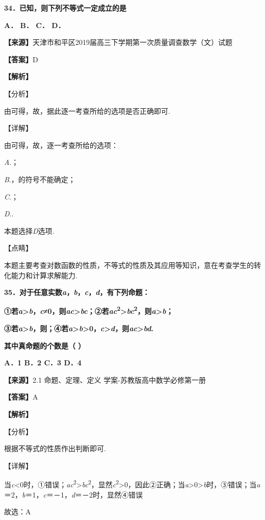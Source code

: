 \textbf{34．已知，则下列不等式一定成立的是}

\textbf{A． B． C． D．}

\textbf{【来源】}天津市和平区2019届高三下学期第一次质量调查数学（文）试题

\textbf{【答案】}D

\textbf{【解析】}

【分析】

由可得，故，据此逐一考查所给的选项是否正确即可.

【详解】

由可得，故，逐一考查所给的选项：

\emph{A}.；

\emph{B}.，的符号不能确定；

\emph{C}.；

\emph{D}..

本题选择\emph{D}选项.

【点睛】

本题主要考查对数函数的性质，不等式的性质及其应用等知识，意在考查学生的转化能力和计算求解能力.

\textbf{35．对于任意实数\emph{a}，\emph{b}，\emph{c}，\emph{d}，有下列命题：}

\textbf{①若\emph{a}\textgreater{}\emph{b}，\emph{c}≠0，则\emph{ac}\textgreater{}\emph{bc}；②若\emph{ac}\textsuperscript{2}\textgreater{}\emph{bc}\textsuperscript{2}，则\emph{a}\textgreater{}\emph{b}；}

\textbf{③若\emph{a}\textgreater{}\emph{b}，则；④若\emph{a}\textgreater{}\emph{b}\textgreater0，\emph{c}\textgreater{}\emph{d}，则\emph{ac}\textgreater{}\emph{bd}.}

\textbf{其中真命题的个数是（ ）}

\textbf{A．1 B．2 C．3 D．4}

\textbf{【来源】}2.1 命题、定理、定义 学案-苏教版高中数学必修第一册

\textbf{【答案】}A

\textbf{【解析】}

【分析】

根据不等式的性质作出判断即可.

【详解】

当\emph{c}\textless0时，①错误；\emph{ac}\textsuperscript{2}\textgreater{}\emph{bc}\textsuperscript{2}，显然\emph{c}\textsuperscript{2}\textgreater0，因此②正确；当\emph{a}\textgreater0\textgreater{}\emph{b}时，③错误；当\emph{a}＝2，\emph{b}＝1，\emph{c}＝－1，\emph{d}＝－2时，显然④错误

故选：A

